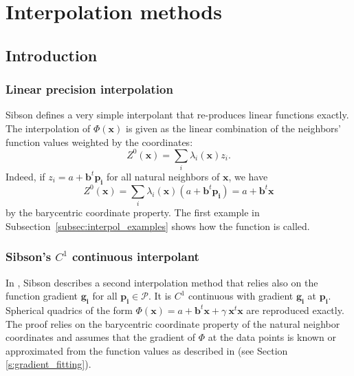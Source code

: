 \section{Interpolation methods}\label{sec:interpolation}
\subsection{Introduction}
\subsubsection{Linear precision interpolation}

Sibson \cite{s-bdnni-81} defines a very simple interpolant that
re-produces linear functions exactly. The interpolation of
$\Phi(\mathbf{x})$ is given as the linear combination of the neighbors' function
values weighted by the coordinates:
\begin{displaymath}
  Z^0(\mathbf{x}) = \sum_i  \lambda_i(\mathbf{x}) z_i.
\end{displaymath}
Indeed, if $z_i=a + \mathbf{b}^t \mathbf{p_i}$ for all natural
neighbors of $\mathbf{x}$, we have
\[  Z^0(\mathbf{x}) = \sum_i  \lambda_i(\mathbf{x}) (a + \mathbf{b}^t\mathbf{p_i}) = a+\mathbf{b}^t \mathbf{x}\]
by the barycentric coordinate property. The first example in
Subsection~\ref{subsec:interpol_examples} shows how the function is
called.

\subsubsection{Sibson's $C^1$ continuous interpolant}
In \cite{s-bdnni-81}, Sibson describes a second interpolation method
that relies also on the function gradient $\mathbf{g_i}$ for all $\mathbf{p_i} \in \mathcal{P}$. It is $C^1$ continuous with gradient $\mathbf{g_i}$ at
$\mathbf{p_i}$. Spherical quadrics of the form $\Phi(\mathbf{x}) =a +
\mathbf{b}^t \mathbf{x} +\gamma\ \mathbf{x}^t\mathbf{x}$ are reproduced 
exactly. The
proof relies on the barycentric coordinate property of the natural
neighbor coordinates and assumes that the gradient of $\Phi$ at the
data points is known or approximated from the function values as
described in \cite{s-bdnni-81} (see Section \ref{s:gradient_fitting}). 

